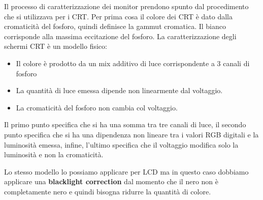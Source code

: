 Il processo di caratterizzazione dei monitor prendono spunto dal procedimento che si 
utilizzava per i CRT. Per prima cosa il colore dei CRT è dato dalla cromaticità 
del fosforo, quindi definisce la gammut cromatica. Il bianco corrisponde
alla massima eccitazione del fosforo. La caratterizzazione degli schermi CRT è un
modello fisico:
\begin{itemize}
    \item Il colore è prodotto da un mix additivo di luce corrispondente a 3 canali
          di fosforo
    \item La quantità di luce emessa dipende non linearmente dal voltaggio.
    \item La cromaticità del fosforo non cambia col voltaggio.
\end{itemize}

Il primo punto specifica che si ha una somma tra tre canali di luce, il secondo
punto specifica che si ha una dipendenza non lineare tra i valori RGB digitali e
la luminosità emessa, infine, l'ultimo specifica che il voltaggio modifica solo 
la luminosità e non la cromaticità.

Lo stesso modello lo possiamo applicare per LCD ma in questo caso dobbiamo applicare
una \textbf{blacklight correction} dal momento che il nero non è completamente nero
e quindi bisogna ridurre la quantità di colore.